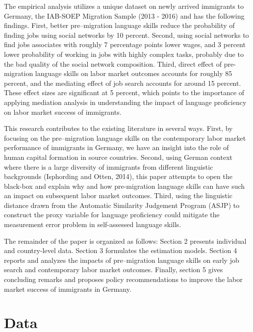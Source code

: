 \documentclass[12pt,a4paper]{article}
\begin{document}
The empirical analysis utilizes a unique dataset on newly arrived immigrants to Germany, the IAB-SOEP Migration Sample (2013 - 2016) and has the following findings. First, better pre--migration language skills reduce the probability of finding jobs using social networks by 10 percent. Second, using social networks to find jobs associates with roughly 7 percentage points lower wages, and 3 percent lower probability of working in jobs with highly complex tasks, probably due to the bad quality of the social network composition. Third, direct effect of pre-migration language skills on labor market outcomes accounts for roughly 85 percent, and the mediating effect of job search accounts for around 15 percent. These effect sizes are significant at 5 percent, which points to the importance of applying mediation analysis in understanding the impact of language proficiency on labor market success of immigrants.

This research contributes to the existing literature in several ways. First, by focusing on the pre--migration language skills on the contemporary labor market performance of immigrants in Germany, we have an insight into the role of human capital formation in source countries. Second, using German context where there is a large diversity of immigrants from different linguistic backgrounds (Isphording and Otten, 2014), this paper attempts to open the black-box and explain why and how pre-migration language skills can have such an impact on subsequent labor market outcomes. Third, using the linguistic distance drawn from the Automatic Similarity Judgement Program (ASJP) to construct the proxy variable for language proficiency could mitigate the measurement error problem in self-assessed language skills.

The remainder of the paper is organized as follows: Section 2 presents individual and country-level data. Section 3 formulates the estimation models. Section 4 reports and analyzes the impacts of pre--migration language skills on early job search and contemporary labor market outcomes. Finally, section 5 gives concluding remarks and proposes policy recommendations to improve the labor market success of immigrants in Germany.

\section{Data}
\end{document}
